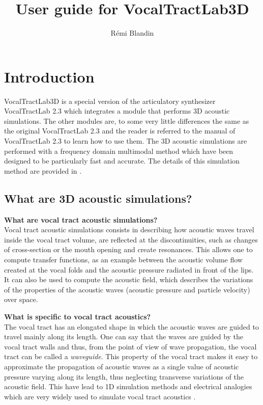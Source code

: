 \documentclass[]{article}
\title{User guide for VocalTractLab3D}
\author{R{\'e}mi Blandin}
\begin{document}
	
	\lstset{ 
		language=Matlab, 
		tabsize=2, 
		showspaces=false, 
		showstringspaces=false, 
		float=[htb], 
		captionpos=b, 
		basicstyle=\footnotesize, 
		frame=tbrl, %
		frameround=tttt, 
		numbers=left, 
		numberstyle=\tiny, 
		numberblanklines=false, 
	} 
	
	
	\maketitle
	
	\tableofcontents
	
	\section{Introduction}
	
	VocalTractLab3D is a special version of the articulatory synthesizer
	VocalTractLab 2.3 which integrates a module that performs 3D acoustic simulations. The other modules are, to some very little differences the same as the original VocalTractLab 2.3 
	\cite{birkholz2013modeling} and the 
	reader is referred to the manual of VocalTractLab 2.3 to learn
	how to use them.
	The 3D acoustic simulations are performed with a frequency domain
	multimodal method which have been designed to be particularly 
	fast and accurate. The details of this simulation method are 
	provided in \textcite{blandin2022efficient}.
	
	\subsection{What are 3D acoustic simulations?}
	
	\textbf{What are vocal tract acoustic simulations?}\\ 
	Vocal tract acoustic simulations consists in describing how acoustic waves travel
	inside the vocal tract volume, are reflected at the discontinuities, such as 
	changes of cross-section or the mouth opening and create resonances. 
	This allows one to compute transfer functions, as an example between the acoustic volume flow created at the vocal folds and the acoustic pressure radiated in front of the lips. It can also be used to 
	compute the acoustic field, which describes the variations of the  
	properties of the acoustic waves (acoustic pressure and particle velocity) over space.
	
	\textbf{What is specific to vocal tract acoustics?}\\
	The vocal tract has an elongated shape in which the acoustic waves 
	are guided to travel mainly along its length. One can say that the
	waves are guided by the vocal tract walls and thus, from the point
	of view of wave propagation, the vocal tract can be called a 
	\emph{waveguide}.
	This property of the vocal tract makes it easy to approximate the 
	propagation of acoustic waves as a single value of acoustic 
	pressure varying along its length, thus neglecting transverse 
	variations of the acoustic field. This have lead to 1D simulation 
	methods and electrical analogies which are very widely used to 
	simulate vocal tract acoustics \cite{sondhi1987hybrid}.
	
\end{document}
